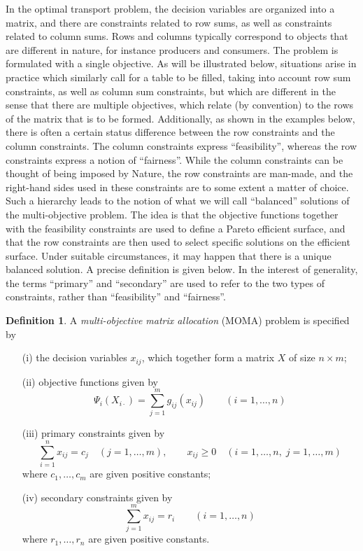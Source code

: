 \documentclass{article}
\theoremstyle{definition}
\newtheorem{definition}[theorem]{Definition}
\begin{document}
In the optimal transport problem, the decision variables are organized into a matrix, and there are constraints related to row sums, as well as constraints related to column sums. Rows and columns typically correspond to objects that are different in nature, for instance producers and consumers. The problem is formulated with a single objective. As will be illustrated below, situations arise in practice which similarly call for a table to be filled, taking into account row sum constraints, as well as column sum constraints, but which are different in the sense that there are multiple objectives, which relate (by convention) to the rows of the matrix that is to be formed. Additionally, as shown in the examples below, there is often a certain status difference between the row constraints and the column constraints. The column constraints express ``feasibility'', whereas the row constraints express a notion of ``fairness''\!. While the column constraints can be thought of being imposed by Nature, the row constraints are man-made, and the right-hand sides used in these constraints are to some extent a matter of choice. Such a hierarchy leads to the notion of what we will call ``balanced'' solutions of the multi-objective problem. The idea is that the objective functions together with the feasibility constraints are used to define a Pareto efficient surface, and that the row constraints are then used to select specific solutions on the efficient surface. Under suitable circumstances, it may happen that there is a unique balanced solution. A precise definition is given below. In the interest of generality, the terms ``primary'' and ``secondary'' are used to refer to the two types of constraints, rather than ``feasibility'' and ``fairness''\!.
\vskip2mm
\begin{definition} \label{moma}
A \emph{multi-objective matrix allocation} (MOMA) problem is specified by
\begin{itemize}
\item[(i)] the decision variables $x_{ij}$, which together form a matrix $X$ of size $n \times m$;
\item[(ii)] objective functions given by
$$
\Psi_i(X_{i\cdot}) = \sum_{j=1}^m g_{ij}(x_{ij}) \qquad (i=1,\dots,n)
$$
\item[(iii)] primary constraints given by
$$
\sum_{i=1}^n x_{ij} = c_j \quad (j=1,\dots,m), \qquad x_{ij} \geq 0 \quad (i=1,\dots,n,\; j = 1,\dots,m)
$$
where $c_1,\dots,c_m$ are given positive constants;
\item[(iv)] secondary constraints given by
$$
\sum_{j=1}^m x_{ij} = r_i \qquad (i=1,\dots,n)
$$
where $r_1,\dots,r_n$ are given positive constants.
\end{itemize}
\end{definition}
\end{document}
